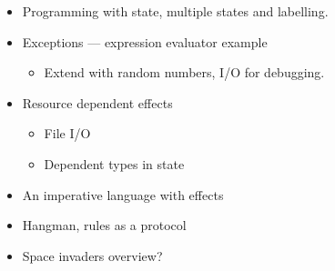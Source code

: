 \begin{itemize}
\item Programming with state, multiple states and labelling.
\item Exceptions --- expression evaluator example
\begin{itemize}
\item Extend with random numbers, I/O for debugging.
\end{itemize}
\item Resource dependent effects
\begin{itemize}
\item File I/O
\item Dependent types in state
\end{itemize}
\item An imperative language with effects
\item Hangman, rules as a protocol
\item Space invaders overview?
\end{itemize}
